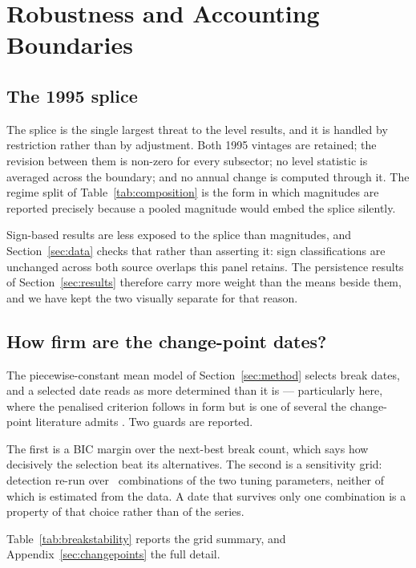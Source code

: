 
\section{Robustness and Accounting Boundaries}
\label{sec:robustness}

\subsection{The 1995 splice}

The splice is the single largest threat to the level results, and it is handled by
restriction rather than by adjustment. Both 1995 vintages are retained; the revision
between them is non-zero for every subsector; no level statistic is averaged across
the boundary; and no annual change is computed through it. The regime split of
Table~\ref{tab:composition} is the form in which magnitudes are reported precisely
because a pooled magnitude would embed the splice silently.

Sign-based results are less exposed to the splice than magnitudes, and
Section~\ref{sec:data} checks that rather than asserting it: sign classifications are
unchanged across both source overlaps this panel retains. The persistence results of
Section~\ref{sec:results} therefore carry more weight than the means beside them, and
we have kept the two visually separate for that reason.

\subsection{How firm are the change-point dates?}

The piecewise-constant mean model of Section~\ref{sec:method} selects break dates,
and a selected date reads as more determined than it is --- particularly here, where
the penalised criterion follows \citet{yao1988} in form but is one of several the
change-point literature admits \citep{baiperron1998}. Two guards are reported.

The first is a BIC margin over the next-best break count, which says how decisively
the selection beat its alternatives. The second is a sensitivity grid: detection
re-run over \BreakSpecifications\ combinations of the two tuning parameters, neither
of which is estimated from the data. A date that survives only one combination is a
property of that choice rather than of the series.

Table~\ref{tab:breakstability} reports the grid summary, and
Appendix~\ref{sec:changepoints} the full detail.

